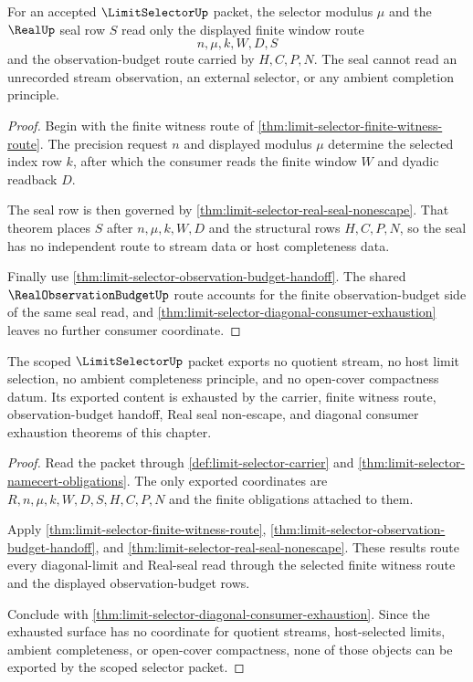\begin{theorem}
\label{thm:limit-selector-modulus-seal-scope}
For an accepted $\LimitSelectorUp$ packet, the selector modulus $\mu$ and the $\RealUp$ seal row $S$ read only the displayed finite window route
$$
n,\mu,k,W,D,S
$$
and the observation-budget route carried by $H,C,P,N$. The seal cannot read an unrecorded stream observation, an external selector, or any ambient completion principle.
\end{theorem}
\begin{proof}
Begin with the finite witness route of \autoref{thm:limit-selector-finite-witness-route}. The precision request $n$ and displayed modulus $\mu$ determine the selected index row $k$, after which the consumer reads the finite window $W$ and dyadic readback $D$.

The seal row is then governed by \autoref{thm:limit-selector-real-seal-nonescape}. That theorem places $S$ after $n,\mu,k,W,D$ and the structural rows $H,C,P,N$, so the seal has no independent route to stream data or host completeness data.

Finally use \autoref{thm:limit-selector-observation-budget-handoff}. The shared $\RealObservationBudgetUp$ route accounts for the finite observation-budget side of the same seal read, and \autoref{thm:limit-selector-diagonal-consumer-exhaustion} leaves no further consumer coordinate.
\end{proof}

\begin{theorem}
\label{thm:limit-selector-nonescape-scope}
The scoped $\LimitSelectorUp$ packet exports no quotient stream, no host limit selection, no ambient completeness principle, and no open-cover compactness datum. Its exported content is exhausted by the carrier, finite witness route, observation-budget handoff, Real seal non-escape, and diagonal consumer exhaustion theorems of this chapter.
\end{theorem}
\begin{proof}
Read the packet through \autoref{def:limit-selector-carrier} and \autoref{thm:limit-selector-namecert-obligations}. The only exported coordinates are $R,n,\mu,k,W,D,S,H,C,P,N$ and the finite obligations attached to them.

Apply \autoref{thm:limit-selector-finite-witness-route}, \autoref{thm:limit-selector-observation-budget-handoff}, and \autoref{thm:limit-selector-real-seal-nonescape}. These results route every diagonal-limit and Real-seal read through the selected finite witness route and the displayed observation-budget rows.

Conclude with \autoref{thm:limit-selector-diagonal-consumer-exhaustion}. Since the exhausted surface has no coordinate for quotient streams, host-selected limits, ambient completeness, or open-cover compactness, none of those objects can be exported by the scoped selector packet.
\end{proof}

